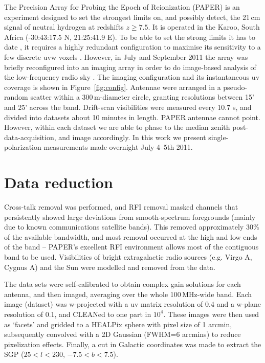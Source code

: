 \documentclass[useAMS,usenatbib]{mn2e}
\begin{document}
The Precision Array for Probing the Epoch of Reionization (PAPER) is an experiment designed to set the strongest limits on, and possibly detect, the 21\,cm signal of neutral hydrogen at redshifts $z \geq 7.5$. It is operated in the Karoo, South Africa (-30:43:17.5 N, 21:25:41.9 E). To be able to set the strong limits it has to date \citep{Parsons.14, Jacobs.14, Ali.15, Moore.15}, it requires a highly redundant configuration to maximise its sensitivity to a few discrete uvw voxels \citep{Parsons.12}. However, in July and September 2011 the array was briefly reconfigured into an imaging array in order to do image-based analysis of the low-frequency radio sky \citep[e.g.][]{Jacobs.11, Stefan.13}. The imaging configuration and its instantaneous uv coverage is shown in Figure~\ref{fig:config}. Antennae were arranged in a pseudo-random scatter within a 300\,m-diameter circle, granting resolutions between 15' and 25' across the band.
Drift-scan visibilities were measured every 10.7 s, and divided into datasets about 10 minutes in length. PAPER antennae cannot point. However, within each dataset we are able to phase to the median zenith post-data-acquisition, and image accordingly. In this work we present single-polarization measurements made overnight July 4--5th 2011.

\section{Data reduction}
\label{sec:reduc}

Cross-talk removal was performed, and RFI removal masked channels that persistently showed large deviations from smooth-spectrum foregrounds (mainly due to known communications satellite bands). This removed approximately 30\% of the available bandwidth, and most removal occurred at the high and low ends of the band -- PAPER's excellent RFI environment allows most of the contiguous band to be used. Visibilities of bright extragalactic radio sources (e.g. Virgo A, Cygnus A) and the Sun were modelled and removed from the data. 

The data sets were self-calibrated to obtain complex gain solutions for each antenna, and then imaged, averaging over the whole 100\,MHz-wide band. Each image (dataset) was w-projected with a uv matrix resolution of 0.4 and a w-plane resolution of 0.1, and CLEANed \citep{Clark.80} to one part in $10^4$. These images were then used as `facets' and gridded to a HEALPix \citep{Gorski.05, Gorski.11} sphere with pixel size of 1 arcmin, subsequently convolved with a 2D Gaussian (FWHM=6 arcmins) to reduce pixelization effects. Finally, a cut in Galactic coordinates was made to extract the SGP ($25<l<230$, $-7.5<b<7.5$).
\end{document}
